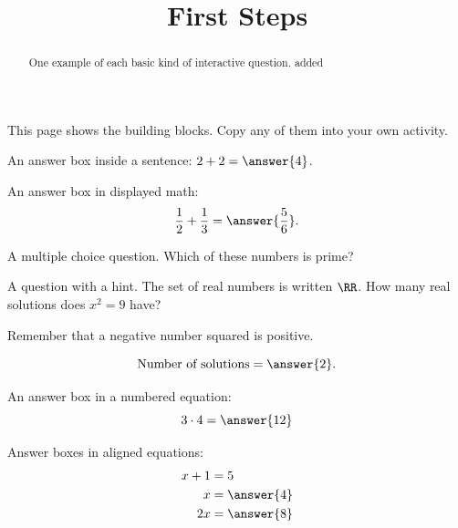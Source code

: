 \documentclass{ximera}
\title{First Steps}
\begin{document}
\begin{abstract}
One example of each basic kind of interactive question. added
\end{abstract}
\maketitle

This page shows the building blocks. Copy any of them into your own activity.

\begin{problem}
An answer box inside a sentence: $2+2=\answer{4}$.
\end{problem}

\begin{problem}
An answer box in displayed math:
\[
\frac{1}{2}+\frac{1}{3}=\answer{\frac{5}{6}}.
\]
\end{problem}

\begin{problem}
A multiple choice question. Which of these numbers is prime?

\begin{multipleChoice}
\end{multipleChoice}
\end{problem}

\begin{problem}
A question with a hint. The set of real numbers is written $\RR$. How many
real solutions does $x^2=9$ have?

\begin{hint}
Remember that a negative number squared is positive.
\end{hint}

\[
\text{Number of solutions}=\answer{2}.
\]
\end{problem}

\begin{problem}
An answer box in a numbered equation:
\begin{equation}
3\cdot 4=\answer{12}
\end{equation}
\end{problem}

\begin{problem}
Answer boxes in aligned equations:
\begin{align*}
x+1&=5 \\
x&=\answer{4} \\
2x&=\answer{8}
\end{align*}
\end{problem}
\end{document}
